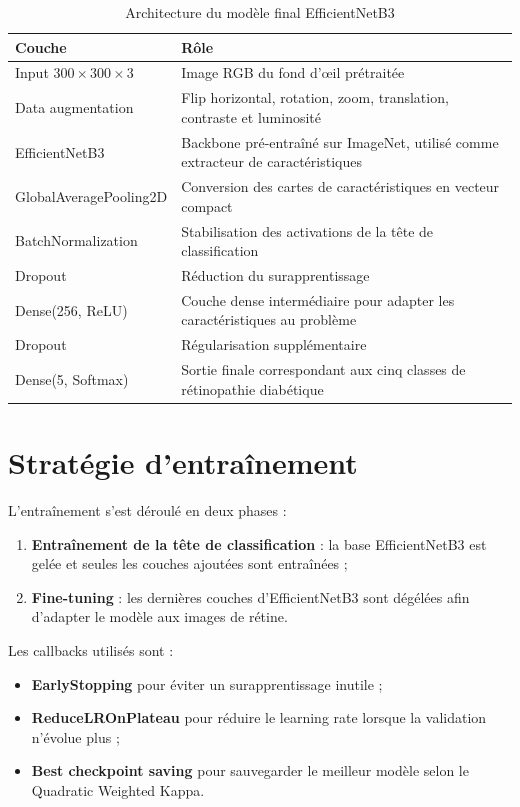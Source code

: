 \documentclass[12pt,a4paper]{report}
\begin{document}
\begin{table}[H]
\centering
\caption{Architecture du modèle final EfficientNetB3}
\label{tab:efficientnet_architecture}
\begin{tabularx}{\textwidth}{lX}
\toprule
Couche & Rôle \\
\midrule
Input \(300 \times 300 \times 3\) & Image RGB du fond d'œil prétraitée \\
Data augmentation & Flip horizontal, rotation, zoom, translation, contraste et luminosité \\
EfficientNetB3 & Backbone pré-entraîné sur ImageNet, utilisé comme extracteur de caractéristiques \\
GlobalAveragePooling2D & Conversion des cartes de caractéristiques en vecteur compact \\
BatchNormalization & Stabilisation des activations de la tête de classification \\
Dropout & Réduction du surapprentissage \\
Dense(256, ReLU) & Couche dense intermédiaire pour adapter les caractéristiques au problème \\
Dropout & Régularisation supplémentaire \\
Dense(5, Softmax) & Sortie finale correspondant aux cinq classes de rétinopathie diabétique \\
\bottomrule
\end{tabularx}
\end{table}

\section{Stratégie d'entraînement}
L'entraînement s'est déroulé en deux phases :
\begin{enumerate}
    \item \textbf{Entraînement de la tête de classification} : la base EfficientNetB3 est gelée et seules les couches ajoutées sont entraînées ;
    \item \textbf{Fine-tuning} : les dernières couches d'EfficientNetB3 sont dégélées afin d'adapter le modèle aux images de rétine.
\end{enumerate}

Les callbacks utilisés sont :
\begin{itemize}
    \item \textbf{EarlyStopping} pour éviter un surapprentissage inutile ;
    \item \textbf{ReduceLROnPlateau} pour réduire le learning rate lorsque la validation n'évolue plus ;
    \item \textbf{Best checkpoint saving} pour sauvegarder le meilleur modèle selon le Quadratic Weighted Kappa.
\end{itemize}
\end{document}
